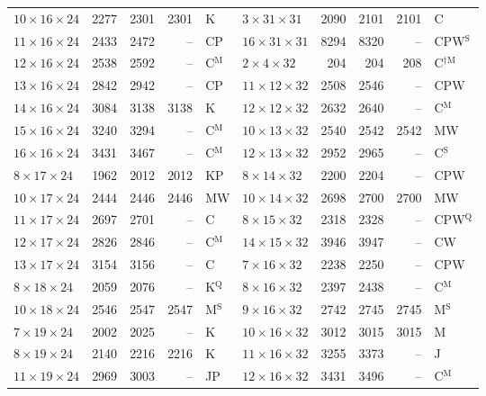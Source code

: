 \begin{longtable}{@{}lrrrl@{\hspace{6mm}}lrrrl@{}}
$10{\times}16{\times}24$ & 2277 & 2301 & 2301 & K & $3{\times}31{\times}31$ & 2090 & 2101 & 2101 & C\\
$11{\times}16{\times}24$ & 2433 & 2472 & -- & CP & $16{\times}31{\times}31$ & 8294 & 8320 & -- & CPW$^{\mathrm{S}}$\\
$12{\times}16{\times}24$ & 2538 & 2592 & -- & C$^{\mathrm{M}}$ & $2{\times}4{\times}32$ & 204 & 204 & 208 & C$^{\dagger\mathrm{M}}$\\
$13{\times}16{\times}24$ & 2842 & 2942 & -- & CP & $11{\times}12{\times}32$ & 2508 & 2546 & -- & CPW\\
$14{\times}16{\times}24$ & 3084 & 3138 & 3138 & K & $12{\times}12{\times}32$ & 2632 & 2640 & -- & C$^{\mathrm{M}}$\\
$15{\times}16{\times}24$ & 3240 & 3294 & -- & C$^{\mathrm{M}}$ & $10{\times}13{\times}32$ & 2540 & 2542 & 2542 & MW\\
$16{\times}16{\times}24$ & 3431 & 3467 & -- & C$^{\mathrm{M}}$ & $12{\times}13{\times}32$ & 2952 & 2965 & -- & C$^{\mathrm{S}}$\\
$8{\times}17{\times}24$ & 1962 & 2012 & 2012 & KP & $8{\times}14{\times}32$ & 2200 & 2204 & -- & CPW\\
$10{\times}17{\times}24$ & 2444 & 2446 & 2446 & MW & $10{\times}14{\times}32$ & 2698 & 2700 & 2700 & MW\\
$11{\times}17{\times}24$ & 2697 & 2701 & -- & C & $8{\times}15{\times}32$ & 2318 & 2328 & -- & CPW$^{\mathrm{Q}}$\\
$12{\times}17{\times}24$ & 2826 & 2846 & -- & C$^{\mathrm{M}}$ & $14{\times}15{\times}32$ & 3946 & 3947 & -- & CW\\
$13{\times}17{\times}24$ & 3154 & 3156 & -- & C & $7{\times}16{\times}32$ & 2238 & 2250 & -- & CPW\\
$8{\times}18{\times}24$ & 2059 & 2076 & -- & K$^{\mathrm{Q}}$ & $8{\times}16{\times}32$ & 2397 & 2438 & -- & C$^{\mathrm{M}}$\\
$10{\times}18{\times}24$ & 2546 & 2547 & 2547 & M$^{\mathrm{S}}$ & $9{\times}16{\times}32$ & 2742 & 2745 & 2745 & M$^{\mathrm{S}}$\\
$7{\times}19{\times}24$ & 2002 & 2025 & -- & K & $10{\times}16{\times}32$ & 3012 & 3015 & 3015 & M\\
$8{\times}19{\times}24$ & 2140 & 2216 & 2216 & K & $11{\times}16{\times}32$ & 3255 & 3373 & -- & J\\
$11{\times}19{\times}24$ & 2969 & 3003 & -- & JP & $12{\times}16{\times}32$ & 3431 & 3496 & -- & C$^{\mathrm{M}}$\\

\end{longtable}
